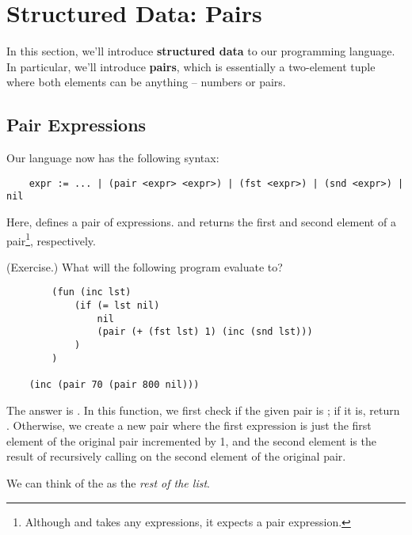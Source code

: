 \documentclass[letterpaper]{article}
\begin{document}
\section{Structured Data: Pairs}
In this section, we'll introduce \textbf{structured data} to our programming language. In particular, we'll introduce \textbf{pairs}, which is essentially a two-element tuple where both elements can be anything -- numbers or pairs.

\subsection{Pair Expressions}
Our language now has the following syntax: 
\begin{verbatim}
    expr := ... | (pair <expr> <expr>) | (fst <expr>) | (snd <expr>) | nil\end{verbatim}
Here,  defines a pair of expressions.  and  returns the first and second element of a pair\footnote{Although  and  takes any expressions, it expects a pair expression.}, respectively.

\begin{mdframed}
    (Exercise.) What will the following program evaluate to? 
    \begin{verbatim}
        (fun (inc lst)
            (if (= lst nil)
                nil
                (pair (+ (fst lst) 1) (inc (snd lst)))
            )
        )
    
    (inc (pair 70 (pair 800 nil)))\end{verbatim}

    \begin{mdframed}
        The answer is . In this function, we first check if the given pair is ; if it is, return . Otherwise, we create a new pair where the first expression is just the first element of the original pair incremented by 1, and the second element is the result of recursively calling  on the second element of the original pair.

        \bigskip 

        We can think of the  as the \emph{rest of the list}. 
    \end{mdframed}
\end{mdframed}
\end{document}
